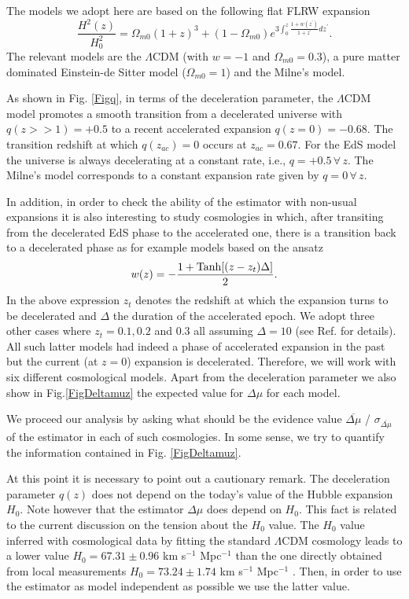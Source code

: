 \documentclass[nofootinbib,twocolumn]{revtex4}
\begin{document}
The models we adopt here are based on the following flat FLRW expansion 
\begin{equation}
\frac{H^2(z)}{H_0^2}= \Omega_{m0} (1+z)^3 + (1-\Omega_{m0})e^{3\int^z_0 \frac{1+w(z^{\prime})}{1+z^{\prime}}dz^{\prime}}.
\end{equation}
The relevant models are the $\Lambda$CDM (with $w=-1$ and $\Omega_{m0}=0.3$), a pure matter dominated Einstein-de Sitter model ($\Omega_{m0}=1$) and the Milne's model.

As shown in Fig. \ref{Figq}, in terms of the deceleration parameter, the $\Lambda$CDM model promotes a smooth transition from a decelerated universe with $q (z>>1) = +0.5$ to a recent accelerated expansion $q(z=0) = -0.68$. The transition redshift at which $q (z_{ac})=0$ occurs at $z_{ac} = 0.67$. For the EdS model the universe is always decelerating at a constant rate, i.e., $q=+0.5 \,\forall \, z$. The Milne's model corresponds to a constant expansion rate given by $q=0 \,\forall \, z$.

In addition, in order to check the ability of the estimator with non-usual expansions it is also interesting to study cosmologies in which, after transiting from the decelerated EdS phase to the accelerated one, there is a transition back to a decelerated phase as for example models based on the ansatz \cite{Shafieloo:2009ti}
\begin{equation}
w(z)= -\frac{1+{\rm Tanh}[(z-z_t)\Delta]}{2}.
\label{wzt}
\end{equation}
In the above expression $z_t$ denotes the redshift at which the expansion turns to be decelerated and $\Delta$ the duration of the accelerated epoch. 
We adopt three other cases where $z_t=0.1, 0.2$ and $0.3$ all assuming $\Delta=10$ (see Ref. \cite{Shafieloo:2009ti} for details). All such latter models had indeed a phase of accelerated expansion in the past but the current (at $z=0$) expansion is decelerated.
Therefore, we will work with six different cosmological models. Apart from the deceleration parameter we also show in Fig.\ref{FigDeltamuz} the expected value for $\Delta \mu$ for each model. 

We proceed our analysis by asking what should be the evidence value $\overline{\Delta \mu}$ / $\sigma_{\overline{\Delta\mu}}$ of the estimator in each of such cosmologies. In some sense, we try to quantify the information contained in Fig. \ref{FigDeltamuz}.   

At this point it is necessary to point out a cautionary remark. The deceleration parameter $q(z)$ does not depend on the today's value of the Hubble expansion $H_0$. Note however that the estimator $\Delta \mu$ does depend on $H_0$. This fact is related to the current discussion on the tension about the $H_0$ value. The $H_0$ value inferred with cosmological data by fitting the standard $\Lambda$CDM cosmology leads to a lower value $H_0=67.31 \pm 0.96$ km s$^{-1}$ Mpc$^{-1}$ \cite{ADEPlanck} than the one directly obtained from local measurements $H_0=73.24 \pm 1.74$ km s$^{-1}$ Mpc$^{-1}$ \cite{RiessH0}. Then, in order to use the estimator as model independent as possible we use the latter value.
\end{document}
